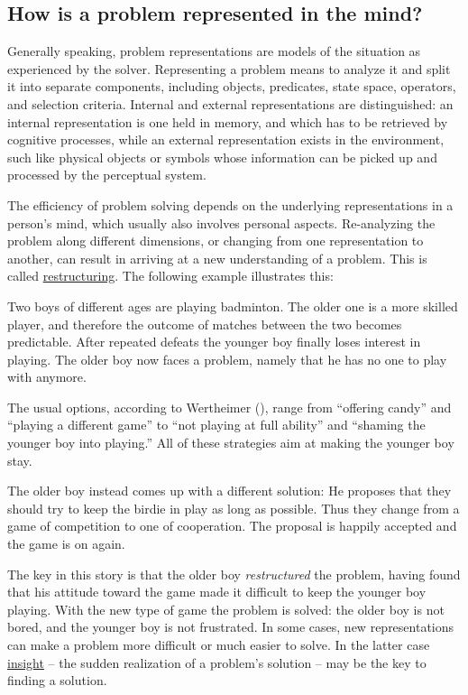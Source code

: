 \documentclass[
]{krantz}
\begin{document}
\subsection*{How is a problem represented in the mind?}\label{how-is-a-problem-represented-in-the-mind}


Generally speaking, problem representations are models of the situation as experienced by the solver. Representing a problem means to analyze it and split it into separate components, including objects, predicates, state space, operators, and selection criteria. Internal and external representations are distinguished: an internal representation is one held in memory, and which has to be retrieved by cognitive processes, while an external representation exists in the environment, such like physical objects or symbols whose information can be picked up and processed by the perceptual system.

The efficiency of problem solving depends on the underlying representations in a person's mind, which usually also involves personal aspects. Re-analyzing the problem along different dimensions, or changing from one representation to another, can result in arriving at a new understanding of a problem. This is called \hyperref[restructuring]{restructuring}. The following example illustrates this:

Two boys of different ages are playing badminton. The older one is a more skilled player, and therefore the outcome of matches between the two becomes predictable. After repeated defeats the younger boy finally loses interest in playing. The older boy now faces a problem, namely that he has no one to play with anymore.

The usual options, according to Wertheimer (), range from ``offering candy'' and ``playing a different game'' to ``not playing at full ability'' and ``shaming the younger boy into playing.'' All of these strategies aim at making the younger boy stay.

The older boy instead comes up with a different solution: He proposes that they should try to keep the birdie in play as long as possible. Thus they change from a game of competition to one of cooperation. The proposal is happily accepted and the game is on again.

The key in this story is that the older boy \emph{restructured} the problem, having found that his attitude toward the game made it difficult to keep the younger boy playing. With the new type of game the problem is solved: the older boy is not bored, and the younger boy is not frustrated. In some cases, new representations can make a problem more difficult or much easier to solve. In the latter case \hyperref[insight]{insight} -- the sudden realization of a problem's solution -- may be the key to finding a solution.
\end{document}
